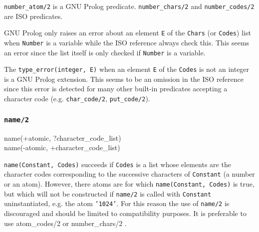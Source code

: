 \Portability

\texttt{number\_atom/2} is a GNU Prolog predicate. \texttt{number\_chars/2}
and \texttt{number\_codes/2} are ISO predicates.

GNU Prolog only raises an error about an element \texttt{E} of the
\texttt{Chars} (or \texttt{Codes}) list when \texttt{Number} is a variable
while the ISO reference always check this. This seems an error since
the list itself is only checked if \texttt{Number} is a variable.

The \texttt{type\_error(integer, E)} when an element \texttt{E} of the
\texttt{Codes} is not an integer is a GNU Prolog extension. This seems to be
an omission in the ISO reference since this error is detected for many other
built-in predicates accepting a character code (e.g. \texttt{char\_code/2},
\texttt{put\_code/2}).

\subsubsection{\texttt{name/2}}

\begin{TemplatesOneCol}
name(+atomic, ?character\_code\_list)\\
name(-atomic, +character\_code\_list)

\end{TemplatesOneCol}

\Description

\texttt{name(Constant, Codes)} succeeds if \texttt{Codes} is a list whose
elements are the character codes corresponding to the successive characters
of \texttt{Constant} (a number or an atom). However, there atoms are for
which \texttt{name(Constant, Codes)} is true, but which will not be
constructed if \texttt{name/2} is called with \texttt{Constant}
uninstantiated, e.g. the atom \texttt{'1024'}. For this reason the use of
\texttt{name/2} is discouraged and should be limited to compatibility
purposes. It is preferable to use atom\_codes/2 
or number\_chars/2 .

\begin{PlErrors}






\end{PlErrors}

